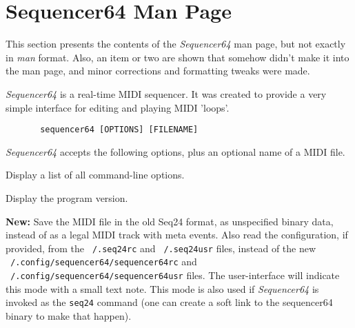 %
%
%

\section{Sequencer64 Man Page}
\label{sec:seq64_man_page}

   This section presents the contents of the \textsl{Sequencer64} man page, but
   not exactly in \textsl{man} format.  Also, an item or two are shown that
   somehow didn't make it into the man page, and minor corrections and
   formatting tweaks were made.

   \textsl{Sequencer64} is a real-time MIDI sequencer. It was created to
   provide a very simple interface for editing and playing MIDI 'loops'.

   \begin{verbatim}
       sequencer64 [OPTIONS] [FILENAME]
   \end{verbatim}

   \textsl{Sequencer64} accepts the following options, plus an optional name of a
   MIDI file.

   \setcounter{ItemCounter}{0}      %

      Display a list of all command-line options.

      Display the program version.

      \textbf{New:}
      Save the MIDI file in the old Seq24 format, as unspecified
      binary data, instead of as a legal MIDI track with meta events.
      Also read the configuration, if provided, from the
      \texttt{~/.seq24rc} and \texttt{~/.seq24usr} files,
      instead of the new
      \texttt{~/.config/sequencer64/sequencer64rc} and
      \texttt{~/.config/sequencer64/sequencer64usr} files.
      The user-interface will indicate this mode with a small text
      note.
      This mode is also used if \textsl{Sequencer64} is invoked as the
      \texttt{seq24} command (one can create a soft link to the sequencer64
      binary to make that happen).

